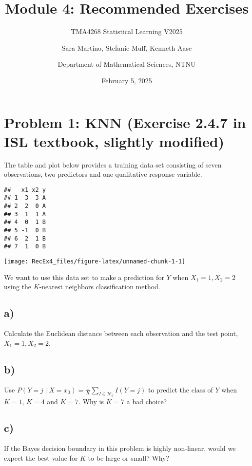 \documentclass[
]{article}
\title{Module 4: Recommended Exercises}
\subtitle{TMA4268 Statistical Learning V2025}
\author{Sara Martino, Stefanie Muff, Kenneth Aase \and Department of
Mathematical Sciences, NTNU}
\date{February 5, 2025}
\begin{document}
\maketitle

\section{Problem 1: KNN (Exercise 2.4.7 in ISL textbook, slightly
modified)}\label{problem-1-knn-exercise-2.4.7-in-isl-textbook-slightly-modified}

The table and plot below provides a training data set consisting of
seven observations, two predictors and one qualitative response
variable.

\begin{verbatim}
##   x1 x2 y
## 1  3  3 A
## 2  2  0 A
## 3  1  1 A
## 4  0  1 B
## 5 -1  0 B
## 6  2  1 B
## 7  1  0 B
\end{verbatim}

\begin{center}\texttt{[image: RecEx4\_files/figure-latex/unnamed-chunk-1-1]} \end{center}

We want to use this data set to make a prediction for \(Y\) when
\(X_1=1, X_2=2\) using the \(K\)-nearest neighbors classification
method.

\subsection{a)}\label{a}

Calculate the Euclidean distance between each observation and the test
point, \(X_1=1,X_2=2\).

\subsection{b)}\label{b}

Use
\(P\left(Y=j\mid X=x_0\right) = \frac{1}{K}\sum_{I \in \mathcal{N}_0}I\left(Y=j\right)\)
to predict the class of \(Y\) when \(K=1\), \(K=4\) and \(K=7\). Why is
\(K=7\) a bad choice?

\subsection{c)}\label{c}

If the Bayes decision boundary in this problem is highly non-linear,
would we expect the best value for \(K\) to be large or small? Why?
\end{document}
